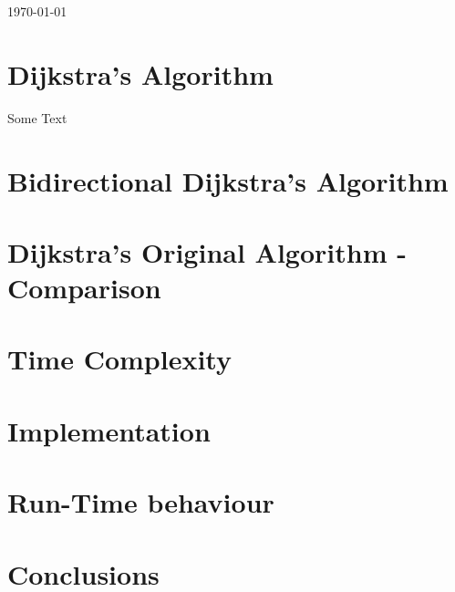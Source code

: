 \documentclass[paper=a4, fontsize=11pt]{scrartcl} %
\begin{document}
\begin{titlepage}

\vspace{5cm}

{\large \today}\\[3cm] %

\vfill %

\end{titlepage}
\clearpage
\setcounter{tocdepth}{1}
\tableofcontents
\clearpage
\twocolumn
\section{Dijkstra's Algorithm}
{Some Text}
\section{Bidirectional Dijkstra's Algorithm}
\section{Dijkstra's Original Algorithm - Comparison}
\section{Time Complexity}
\section{Implementation}
\section{Run-Time behaviour}
\section{Conclusions}
\clearpage
\begin{thebibliography}{9}
\end{thebibliography}
\end{document}
